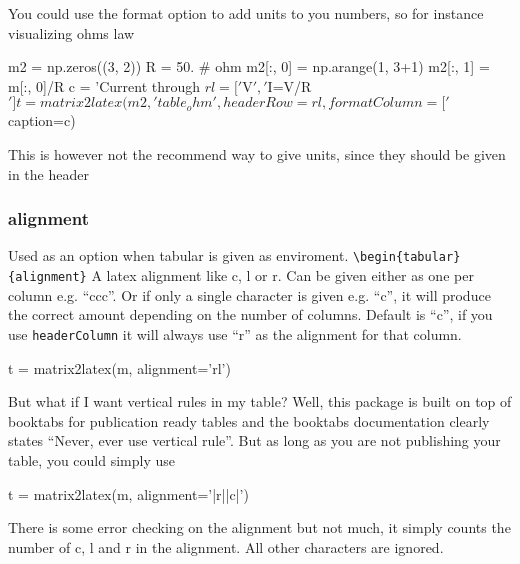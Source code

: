 You could use the format option to add units to you numbers, so for instance
visualizing ohms law
\begin{pygments}
m2 = np.zeros((3, 2))
R = 50. # ohm
m2[:, 0] = np.arange(1, 3+1)
m2[:, 1] = m[:, 0]/R
c = 'Current through $%
rl = ['$V$', '$I=V/R$']
t = matrix2latex(m2, 'table_ohm', headerRow=rl,
                 formatColumn=['$%
                 caption=c)
\end{pygments}


This is however not the recommend way to give units, since they should
be given in the header


\subsubsection{alignment}
Used as an option when tabular is given as enviroment.
\verb!\begin{tabular}{alignment}!
A latex alignment like c, l or r.
Can be given either as one per column e.g. ``ccc''.
Or if only a single character is given e.g. ``c'',
it will produce the correct amount depending on the number of columns.
Default is ``c'', if you use \lstinline{headerColumn} it will always use
``r'' as the alignment for that column.
\begin{pygments}
t = matrix2latex(m, alignment='rl')
\end{pygments}

But what if I want vertical rules in my table? Well, this package is built
on top of booktabs for publication ready tables and the booktabs documentation clearly
states ``Never, ever use vertical rule''. But as long as you are not publishing your table,
you could simply use
\begin{pygments}
t = matrix2latex(m, alignment='|r||c|')
\end{pygments}

There is some error checking on the alignment but not much, it simply counts the number
of c, l and r in the alignment. All other characters are ignored.

